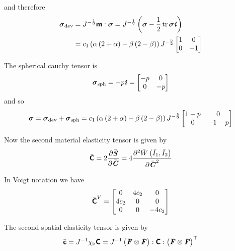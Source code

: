and therefore
\begin{equation}
  \begin{split}
    \tensor{\sigma}_{\devop}&=J^{-\frac{1}{2}}\doubledotprod{\tensorfour{m}}{\bar{\tensor{\sigma}}}=J^{-\frac{1}{2}}\pbrac{\bar{\tensor{\sigma}}-\frac{1}{2}\trace{}{\bar{\tensor{\sigma}}}\tensor{i}}\\
    &=c_{1}\pbrac{\alpha\pbrac{2+\alpha}-\beta\pbrac{2-\beta}}J^{-\frac{5}{2}}\begin{bmatrix}
      1 & 0 \\
      0 & -1
    \end{bmatrix}
  \end{split}
\end{equation}

The spherical cauchy tensor is
\begin{equation}
  \boldsymbol{\mathit{\sigma}}_{\operatorname{sph}}=-p\boldsymbol{\mathit{i}}=\begin{bmatrix}
  -p & 0 \\
  0 & -p
  \end{bmatrix}
\end{equation}
and so
\begin{equation}
  \boldsymbol{\mathit{\sigma}}=\boldsymbol{\mathit{\sigma}}_{\operatorname{dev}}+\boldsymbol{\mathit{\sigma}}_{\operatorname{sph}}=c_{1}\left( \alpha\left( 2+\alpha \right)-\beta\left( 2-\beta \right) \right)J^{-\frac{5}{2}}\begin{bmatrix}
      1-p & 0 \\
      0 & -1-p
    \end{bmatrix}
\end{equation}

Now the second material elasticity tensor is given by
\begin{equation}
  \bar{\boldsymbol{\mathsf{C}}}=2 \dfrac{\partial \bar{\boldsymbol{\mathit{S}}}}{\partial \bar{\boldsymbol{\mathit{C}}}} =4 \dfrac{\partial^{2}  \bar{W}\left( \bar{I}_{1},\bar{I}_{2} \right) }{\partial {\bar{\ensuremath{\boldsymbol{\mathit{C}}}}}^{2}} 
\end{equation}

In Voigt notation we have
\begin{equation}
  \bar{\boldsymbol{\mathsf{C}}}^{V}=\begin{bmatrix}
  0 & 4c_{2} & 0 \\
  4c_{2} & 0 & 0 \\
  0 & 0 & -4c_{2}
  \end{bmatrix}
\end{equation}

The second spatial elasticity tensor is given by
\begin{equation}
  \bar{\boldsymbol{\mathsf{c}}}={J}^{-1} \chi_{\triangleright}\bar{\boldsymbol{\mathsf{C}}} ={J}^{-1} \left(  \bar{\boldsymbol{\mathit{F}}} \otimes \bar{\boldsymbol{\mathit{F}}}  \right) : \bar{\boldsymbol{\mathsf{C}}} :  {\left(  \bar{\boldsymbol{\mathit{F}}} \otimes \bar{\boldsymbol{\mathit{F}}}  \right)}^{ \top }  
\end{equation}


